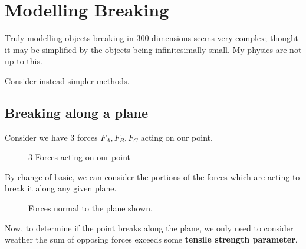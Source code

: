 \documentclass{article}
\begin{document}
\section{Modelling Breaking}
Truly modelling objects breaking in 300 dimensions seems very complex; thought it may be simplified by the objects being infinitesimally small. My physics are not up to this.

Consider instead simpler methods.

\subsection{Breaking along a plane}


Consider we have 3 forces $F_A,F_B, F_C$ acting on our point.
\newcommand{\diagramsetup}{	\node (core) [draw, circle]  {};
	\node(A) [brown]  at (-3,1)  {$F_A$};
	\node(B) [brown]  at (2.5,0.5)  {$F_B$};
	\node(C) [brown]  at (-2,-2)  {$F_C$};
	
	\coordinate (p1) at (1.4,-2);
	\coordinate (p2) at ($-1*(p1)$);
}

\begin{figure}[H]
	\center
	\caption{3 Forces acting on our point}
\end{figure}

By change of basic, we can consider the portions of the forces which are acting to break it along any given plane.

\begin{figure}[H]
	\center
	\caption{Forces normal to the plane shown.}
\end{figure}

Now, to determine if the point breaks along the plane, we only need to consider weather the sum of opposing forces exceeds some \textbf{tensile strength parameter}.
\end{document}

